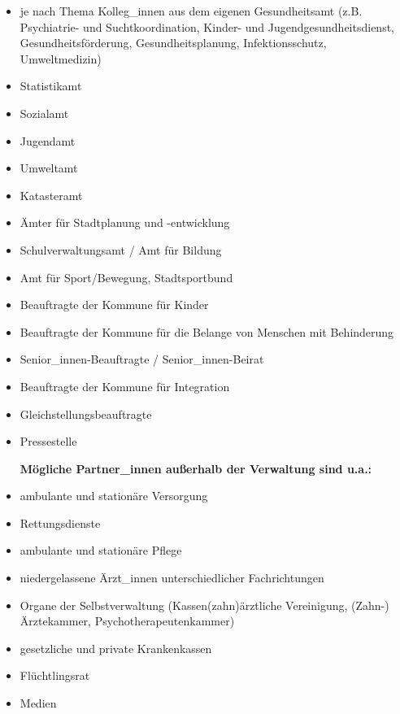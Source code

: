 \documentclass{article}
\begin{document}
\begin{itemize}
\item je nach Thema Kolleg\_innen aus dem eigenen Gesundheitsamt (z.B. Psychiatrie- und Suchtkoordination, Kinder- und Jugendgesundheitsdienst, Gesundheitsförderung, Gesundheitsplanung, Infektionsschutz, Umweltmedizin)


\item Statistikamt


\item Sozialamt


\item Jugendamt


\item Umweltamt


\item Katasteramt 


\end{itemize}
\begin{itemize}
\item Ämter für Stadtplanung und -entwicklung


\end{itemize}
\begin{itemize}
\item Schulverwaltungsamt / Amt für Bildung


\item Amt für Sport/Bewegung, Stadtsportbund


\item Beauftragte der Kommune für Kinder


\item Beauftragte der Kommune für die Belange von Menschen mit Behinderung 


\item Senior\_innen-Beauftragte / Senior\_innen-Beirat


\item Beauftragte der Kommune für Integration


\item Gleichstellungsbeauftragte


\item Pressestelle


\textbf{Mögliche Partner\_innen außerhalb der Verwaltung sind u.a.:}


\item ambulante und stationäre Versorgung


\item Rettungsdienste


\item ambulante und stationäre Pflege


\item niedergelassene Ärzt\_innen unterschiedlicher Fachrichtungen


\item Organe der Selbstverwaltung (Kassen(zahn)ärztliche Vereinigung, (Zahn-) Ärztekammer, Psychotherapeutenkammer)


\item gesetzliche und private Krankenkassen


\item Flüchtlingsrat


\item Medien


\end{itemize}
\end{document}
